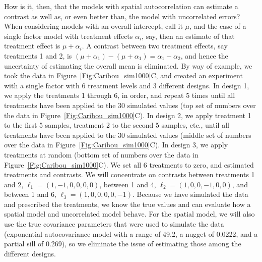 \documentclass[12pt, titlepage]{article}
\begin{document}
How is it, then, that the models with spatial autocorrelation can estimate a contrast as well as, or even better than, the model with uncorrelated errors?  When considering models with an overall intercept, call it $\mu$, and the case of a single factor model with treatment effects $\alpha_{i}$, say, then an estimate of that treatment effect is $\mu + \alpha_{i}$.  A contrast between two treatment effects, say treatments 1 and 2, is $(\mu + \alpha_{1}) - (\mu + \alpha_{1}) = \alpha_{1} - \alpha_{2}$, and hence the uncertainty of estimating the overall mean is eliminated. By way of example, we took the data in Figure~\ref{Fig:Caribou_sim1000}C, and created an experiment with a single factor with 6 treatment levels and 3 different designs.  In design 1, we apply the treatments 1 through 6, in order, and repeat 5 times until all treatments have been applied to the 30 simulated values (top set of numbers over the data in Figure~\ref{Fig:Caribou_sim1000}C).  In design 2, we apply treatment 1 to the first 5 samples, treatment 2 to the second 5 samples, etc., until all treatments have been applied to the 30 simulated values (middle set of numbers over the data in Figure~\ref{Fig:Caribou_sim1000}C). In design 3, we apply treatments at random (bottom set of numbers over the data in Figure~\ref{Fig:Caribou_sim1000}C).  We set all 6 treatments to zero, and estimated treatments and contrasts.  We will concentrate on contrasts between treatments 1 and 2, $\ell_{1} = (1, -1, 0, 0, 0, 0)$, between 1 and 4, $\ell_{2} = (1, 0, 0, -1, 0, 0)$, and between 1 and 6, $\ell_{3} = (1, 0, 0, 0, 0, -1)$.  Because we have simulated the data and prescribed the treatments, we know the true values and can evaluate how a spatial model and uncorrelated model behave.  For the spatial model, we will also use the true covariance parameters that were used to simulate the data (exponential autocovariance model with a range of 49.2, a nugget of 0.0222, and a partial sill of 0.269), so we eliminate the issue of estimating those among the different designs.
\end{document}
